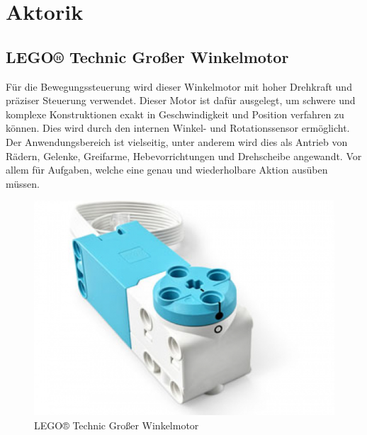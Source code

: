 \section{Aktorik} %
\subsection{LEGO® Technic Großer Winkelmotor}
Für die Bewegungssteuerung wird dieser Winkelmotor mit hoher Drehkraft und präziser Steuerung verwendet. Dieser Motor ist dafür ausgelegt, um schwere und komplexe Konstruktionen exakt in Geschwindigkeit und Position verfahren zu können. Dies wird durch den internen Winkel- und Rotationssensor ermöglicht. Der Anwendungsbereich ist vielseitig, unter anderem wird dies als Antrieb von Rädern, Gelenke, Greifarme, Hebevorrichtungen und Drehscheibe angewandt. Vor allem für Aufgaben, welche eine genau und wiederholbare Aktion ausüben müssen.

\begin{figure}[H]
	\centering
	\includegraphics[width=0.4\linewidth]{images/Motor}
	\caption{LEGO® Technic Großer Winkelmotor}
	\label{fig:motor}
\end{figure}
